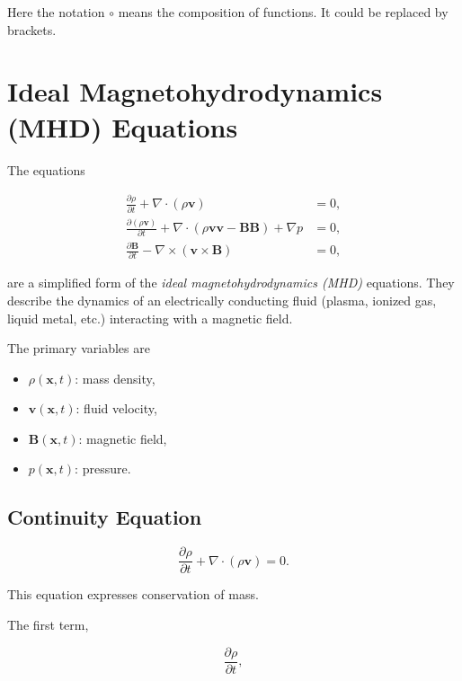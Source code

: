 \documentclass[12pt]{article}
\begin{document}
Here the notation $\circ$ means the composition of functions.
It could be replaced by brackets.



\section{Ideal Magnetohydrodynamics (MHD) Equations}

The equations

\begin{align}
\frac{\partial \rho}{\partial t}
+ \nabla \cdot (\rho \mathbf{v})
&= 0,
\\[1ex]
\frac{\partial (\rho \mathbf{v})}{\partial t}
+ \nabla \cdot
\left(
\rho \mathbf{v}\mathbf{v}
-
\mathbf{B}\mathbf{B}
\right)
+ \nabla p
&= 0,
\\[1ex]
\frac{\partial \mathbf{B}}{\partial t}
-
\nabla \times (\mathbf{v}\times\mathbf{B})
&= 0,
\end{align}

are a simplified form of the \emph{ideal magnetohydrodynamics (MHD)} equations.
They describe the dynamics of an electrically conducting fluid
(plasma, ionized gas, liquid metal, etc.) interacting with a magnetic field.

The primary variables are

\begin{itemize}
\item $\rho(\mathbf{x},t)$: mass density,
\item $\mathbf{v}(\mathbf{x},t)$: fluid velocity,
\item $\mathbf{B}(\mathbf{x},t)$: magnetic field,
\item $p(\mathbf{x},t)$: pressure.
\end{itemize}

\subsection{Continuity Equation}

\begin{equation}
\frac{\partial \rho}{\partial t}
+
\nabla\cdot(\rho\mathbf{v})
=
0.
\end{equation}

This equation expresses conservation of mass.

The first term,

\[
\frac{\partial \rho}{\partial t},
\]
\end{document}
